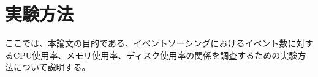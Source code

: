 \documentclass[../../main]{subfiles}
\begin{document}
    \section{実験方法}\label{sec:method}

    ここでは、本論文の目的である、イベントソーシングにおけるイベント数に対するCPU使用率、メモリ使用率、ディスク使用率の関係を調査するための実験方法について説明する。

    

    

    

    

    

    \clearpage
\end{document}
